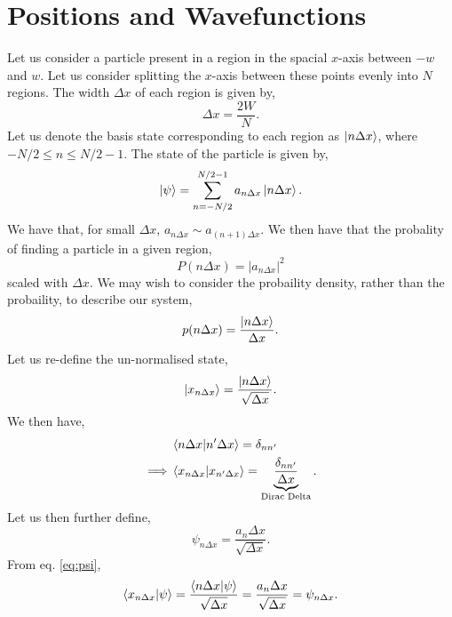 \documentclass{book}
\begin{document}
\section{Positions and Wavefunctions}
Let us consider a particle present in a region in the spacial $x$-axis between $-w$ and $w$. Let us consider splitting the $x$-axis between these points evenly into $N$ regions. The width $\Delta x$ of each region is given by,
\begin{equation}
	\Delta x = \frac{2W}{N}.
\end{equation}
Let us denote the basis state corresponding to each region as $\ket{n\Delta x}$, where $-N/2 \leq n \leq N/2 -1$. The state of the particle is given by,
\begin{equation}
	\ket{\psi} = \sum_{n=-N/2}^{N/2-1}a_{n\Delta x}\ket{n\Delta x}. \label{eq:psi}
\end{equation}
We have that, for small $\Delta x$, $a_{n\Delta x} \sim a_{(n+1)\Delta x}$. We then have that the probality of finding a particle in a given region,
\begin{equation}
	P(n\Delta x) = \left|a_{n\Delta x}\right|^2
\end{equation}
scaled with $\Delta x$. We may wish to consider the probaility density, rather than the probaility, to describe our system,
\begin{equation}
	p(n\Delta x) = \frac{\ket{n\Delta x}}{\Delta x}. \label{eq:probdens}
\end{equation}
Let us re-define the un-normalised state,
\begin{equation}
	\ket{x_{n\Delta x}} = \frac{\ket{n\Delta x}}{\sqrt{\Delta x}}.
\end{equation}
We then have,
\begin{equation}
	\begin{split}
		& \braket{n\Delta x}{n'\Delta x} = \delta_{nn'} \\
		\implies & \braket{x_{n\Delta x}}{x_{n'\Delta x}} = \underbrace{\frac{\delta_{nn'}}{\Delta x}}_{\text{Dirac Delta}}.
	\end{split}
\end{equation}
Let us then further define,
\begin{equation}
	\psi_{n\Delta x} = \frac{a_n\Delta x}{\sqrt{\Delta x}}.
\end{equation}
From eq. \eqref{eq:psi},
\begin{equation}
	\braket{x_{n\Delta x}}{\psi} = \frac{\braket{n\Delta x}{\psi}}{\sqrt{\Delta x}} = \frac{a_n\Delta x}{\sqrt{\Delta x}} = \psi_{n\Delta x}.
\end{equation}
\end{document}
